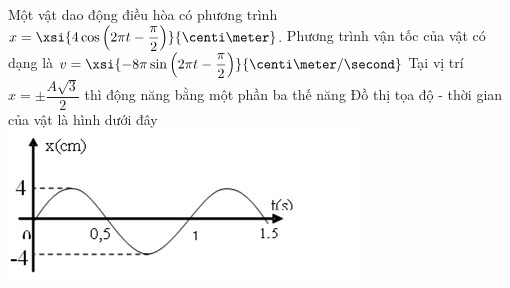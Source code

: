 \begin{ex}
	Một vật dao động điều hòa có phương trình $x=\xsi{4\cos\left(2\pi t-\dfrac{\pi}{2}\right)}{\centi\meter}$. 
	{\True Phương trình vận tốc của vật có dạng là $v=\xsi{-8\pi\sin\left(2\pi t-\dfrac{\pi}{2}\right)}{\centi\meter/\second}$}
	{\True Tại vị trí $x=\pm\dfrac{A\sqrt{3}}{2}$  thì động năng bằng một phần ba thế năng}
	{\True Đồ thị tọa độ - thời gian của vật là hình dưới đây\\
		\includegraphics[width=0.4\linewidth]{../figs/D11-004-3}
	}
	\loigiai{}
\end{ex}

